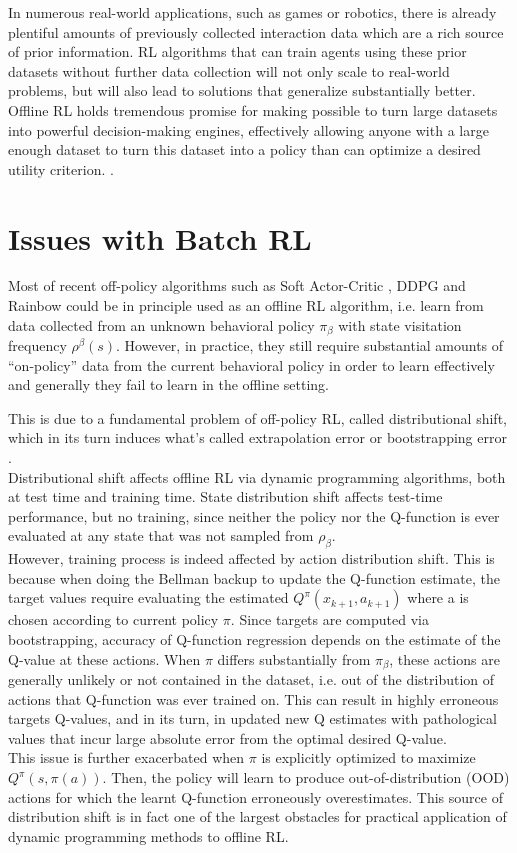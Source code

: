 In numerous real-world applications, such as games or robotics, there is already plentiful amounts 
of previously collected interaction data which are a rich source of prior information.
RL algorithms that can train agents using these prior datasets without further data collection
will not only scale to real-world problems, but will also lead to solutions that generalize substantially better.
Offline RL holds tremendous promise for making possible to turn large datasets into powerful 
decision-making engines, effectively allowing anyone with a large enough dataset to turn this dataset
into a policy than can optimize a desired utility criterion. \citep{levine2020}.


\section{Issues with Batch RL}

Most of recent off-policy algorithms such as Soft Actor-Critic \citep{Haarnoja2018}, 
DDPG \citep{Lillicrap2016} and Rainbow \citep{Hessel2018}  could be in principle used 
as an offline RL algorithm, i.e. learn from data collected from an unknown behavioral policy
$\pi_\beta$ with state visitation frequency $\rho^\beta(s)$. 
However, in practice, they still require substantial amounts
of “on-policy” data from the current behavioral policy in order to learn effectively 
and generally they fail to learn in the offline setting.

This is due to a fundamental problem of off-policy RL, 
called distributional shift, which in 
its turn induces what's called extrapolation error \citep{Fujimoto2019} or bootstrapping error \citet{Kumar2019}.\\
Distributional shift affects offline RL via dynamic programming algorithms, both at test time and training time.
State distribution shift affects test-time performance, but no training, since neither the policy nor
the Q-function is ever evaluated at any state that was not sampled from $\rho_\beta$.\\
However, training process is indeed affected by action distribution shift.
This is because when doing the Bellman backup to update the Q-function estimate,
the target values require evaluating the estimated $Q^\pi(x_{k+1},a_{k+1})$ where
a is chosen according to current policy $\pi$.
Since targets are computed via bootstrapping, accuracy of Q-function regression depends
on the estimate of the Q-value at these actions. When $\pi$ differs substantially from $\pi_\beta$, 
these actions are generally unlikely or not contained in the dataset, i.e.
out of the distribution of actions that Q-function was ever trained on. This can result
in highly erroneous targets Q-values, and in its turn, in updated new Q estimates 
with pathological values that incur large absolute error from the optimal desired Q-value.\\
This issue is further exacerbated when $\pi$ is explicitly optimized to maximize $Q^\pi(s,\pi(a))$.
Then, the policy will learn to produce out-of-distribution (OOD) actions
for which the learnt Q-function erroneously overestimates.
This source of distribution shift is in fact one of the largest obstacles for practical application
of dynamic programming methods to offline RL.


